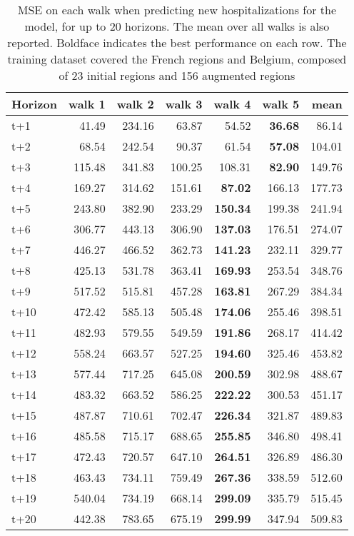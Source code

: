 \begin{table}[H]
\centering
\caption{MSE on each walk when predicting new hospitalizations for the model, for up to 20 horizons. The mean over all walks is also reported. Boldface indicates the best performance on each row. The training dataset covered the French regions and Belgium, composed of 23 initial regions and 156 augmented regions }
\label{tab:MSE_walk_dense_model}
\begin{tabular}{lrrrrrr}
\toprule
Horizon &  walk 1 &  walk 2 &  walk 3 &  walk 4 &  walk 5 &   mean \\
\midrule
t+1  & 41.49  & 234.16  & 63.87  & 54.52  & \textbf{36.68}  & 86.14  \\
t+2  & 68.54  & 242.54  & 90.37  & 61.54  & \textbf{57.08}  & 104.01  \\
t+3  & 115.48  & 341.83  & 100.25  & 108.31  & \textbf{82.90}  & 149.76  \\
t+4  & 169.27  & 314.62  & 151.61  & \textbf{87.02}  & 166.13  & 177.73  \\
t+5  & 243.80  & 382.90  & 233.29  & \textbf{150.34}  & 199.38  & 241.94  \\
t+6  & 306.77  & 443.13  & 306.90  & \textbf{137.03}  & 176.51  & 274.07  \\
t+7  & 446.27  & 466.52  & 362.73  & \textbf{141.23}  & 232.11  & 329.77  \\
t+8  & 425.13  & 531.78  & 363.41  & \textbf{169.93}  & 253.54  & 348.76  \\
t+9  & 517.52  & 515.81  & 457.28  & \textbf{163.81}  & 267.29  & 384.34  \\
t+10  & 472.42  & 585.13  & 505.48  & \textbf{174.06}  & 255.46  & 398.51  \\
t+11  & 482.93  & 579.55  & 549.59  & \textbf{191.86}  & 268.17  & 414.42  \\
t+12  & 558.24  & 663.57  & 527.25  & \textbf{194.60}  & 325.46  & 453.82  \\
t+13  & 577.44  & 717.25  & 645.08  & \textbf{200.59}  & 302.98  & 488.67  \\
t+14  & 483.32  & 663.52  & 586.25  & \textbf{222.22}  & 300.53  & 451.17  \\
t+15  & 487.87  & 710.61  & 702.47  & \textbf{226.34}  & 321.87  & 489.83  \\
t+16  & 485.58  & 715.17  & 688.65  & \textbf{255.85}  & 346.80  & 498.41  \\
t+17  & 472.43  & 720.57  & 647.10  & \textbf{264.51}  & 326.89  & 486.30  \\
t+18  & 463.43  & 734.11  & 759.49  & \textbf{267.36}  & 338.59  & 512.60  \\
t+19  & 540.04  & 734.19  & 668.14  & \textbf{299.09}  & 335.79  & 515.45  \\
t+20  & 442.38  & 783.65  & 675.19  & \textbf{299.99}  & 347.94  & 509.83  \\

\bottomrule
\end{tabular}
\end{table}
